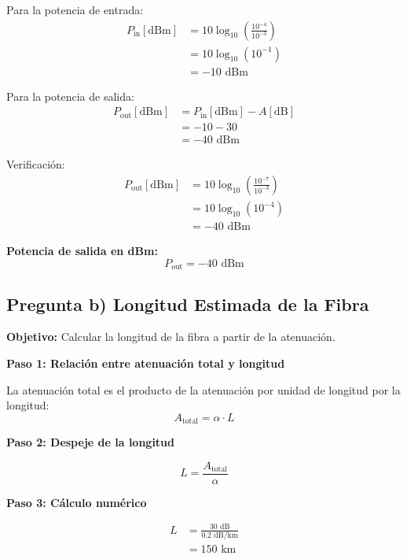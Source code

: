 \documentclass[11pt,a4paper]{article}
\begin{document}
Para la potencia de entrada:
\begin{align}
    P_{\text{in}}[\text{dBm}] &= 10\log_{10}\left(\frac{10^{-4}}{10^{-3}}\right) \\
    &= 10\log_{10}(10^{-1}) \\
    &= -10 \text{ dBm}
\end{align}

Para la potencia de salida:
\begin{align}
    P_{\text{out}}[\text{dBm}] &= P_{\text{in}}[\text{dBm}] - A[\text{dB}] \\
    &= -10 - 30 \\
    &= -40 \text{ dBm}
\end{align}

Verificación:
\begin{align}
    P_{\text{out}}[\text{dBm}] &= 10\log_{10}\left(\frac{10^{-7}}{10^{-3}}\right) \\
    &= 10\log_{10}(10^{-4}) \\
    &= -40 \text{ dBm}
\end{align}

\textbf{Potencia de salida en dBm:}
\begin{equation}
    P_{\text{out}} = -40 \text{ dBm}
\end{equation}

\subsection{Pregunta b) Longitud Estimada de la Fibra}

\textbf{Objetivo:} Calcular la longitud de la fibra a partir de la atenuación.

\textbf{Paso 1: Relación entre atenuación total y longitud}

La atenuación total es el producto de la atenuación por unidad de longitud por la longitud:
\begin{equation}
    A_{\text{total}} = \alpha \cdot L
\end{equation}

\textbf{Paso 2: Despeje de la longitud}

\begin{equation}
    L = \frac{A_{\text{total}}}{\alpha}
\end{equation}

\textbf{Paso 3: Cálculo numérico}

\begin{align}
    L &= \frac{30 \text{ dB}}{0.2 \text{ dB/km}} \\
    &= 150 \text{ km}
\end{align}
\end{document}
